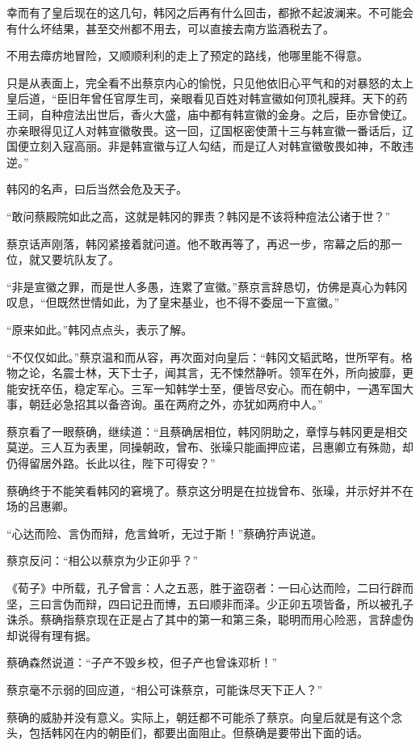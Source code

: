 幸而有了皇后现在的这几句，韩冈之后再有什么回击，都掀不起波澜来。不可能会有什么坏结果，甚至交州都不用去，可以直接去南方监酒税去了。

不用去瘴疠地冒险，又顺顺利利的走上了预定的路线，他哪里能不得意。

只是从表面上，完全看不出蔡京内心的愉悦，只见他依旧心平气和的对暴怒的太上皇后道，“臣旧年曾任官厚生司，亲眼看见百姓对韩宣徽如何顶礼膜拜。天下的药王祠，自种痘法出世后，香火大盛，庙中都有韩宣徽的金身。之后，臣亦曾使辽。亦亲眼得见辽人对韩宣徽敬畏。这一回，辽国枢密使萧十三与韩宣徽一番话后，辽国便立刻入寇高丽。非是韩宣徽与辽人勾结，而是辽人对韩宣徽敬畏如神，不敢违逆。”

韩冈的名声，曰后当然会危及天子。

“敢问蔡殿院如此之高，这就是韩冈的罪责？韩冈是不该将种痘法公诸于世？”

蔡京话声刚落，韩冈紧接着就问道。他不敢再等了，再迟一步，帘幕之后的那一位，就又要坑队友了。

“非是宣徽之罪，而是世人多愚，连累了宣徽。”蔡京言辞恳切，仿佛是真心为韩冈叹息，“但既然世情如此，为了皇宋基业，也不得不委屈一下宣徽。”

“原来如此。”韩冈点点头，表示了解。

“不仅仅如此。”蔡京温和而从容，再次面对向皇后：“韩冈文韬武略，世所罕有。格物之论，名震士林，天下士子，闻其言，无不悚然静听。领军在外，所向披靡，更能安抚卒伍，稳定军心。三军一知韩学士至，便皆尽安心。而在朝中，一遇军国大事，朝廷必急招其以备咨询。虽在两府之外，亦犹如两府中人。”

蔡京看了一眼蔡确，继续道：“且蔡确居相位，韩冈阴助之，章惇与韩冈更是相交莫逆。三人互为表里，同操朝政，曾布、张璪只能画押应诺，吕惠卿立有殊勋，却仍得留居外路。长此以往，陛下可得安？”

蔡确终于不能笑看韩冈的窘境了。蔡京这分明是在拉拢曾布、张璪，并示好并不在场的吕惠卿。

“心达而险、言伪而辩，危言耸听，无过于斯！”蔡确狞声说道。

蔡京反问：“相公以蔡京为少正卯乎？”

《荀子》中所载，孔子曾言：人之五恶，胜于盗窃者：一曰心达而险，二曰行辟而坚，三曰言伪而辩，四曰记丑而博，五曰顺非而泽。少正卯五项皆备，所以被孔子诛杀。蔡确指蔡京现在正是占了其中的第一和第三条，聪明而用心险恶，言辞虚伪却说得有理有据。

蔡确森然说道：“子产不毁乡校，但子产也曾诛邓析！”

蔡京毫不示弱的回应道，“相公可诛蔡京，可能诛尽天下正人？”

蔡确的威胁并没有意义。实际上，朝廷都不可能杀了蔡京。向皇后就是有这个念头，包括韩冈在内的朝臣们，都要出面阻止。但蔡确是要带出下面的话。

